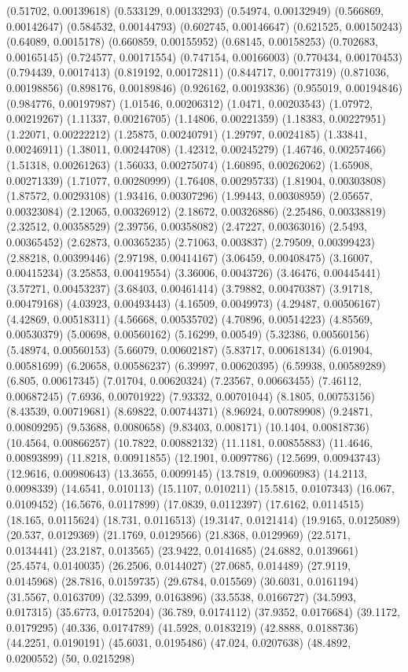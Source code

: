 {(0.51702, 0.00139618)
(0.533129, 0.00133293)
(0.54974, 0.00132949)
(0.566869, 0.00142647)
(0.584532, 0.00144793)
(0.602745, 0.00146647)
(0.621525, 0.00150243)
(0.64089, 0.0015178)
(0.660859, 0.00155952)
(0.68145, 0.00158253)
(0.702683, 0.00165145)
(0.724577, 0.00171554)
(0.747154, 0.00166003)
(0.770434, 0.00170453)
(0.794439, 0.0017413)
(0.819192, 0.00172811)
(0.844717, 0.00177319)
(0.871036, 0.00198856)
(0.898176, 0.00189846)
(0.926162, 0.00193836)
(0.955019, 0.00194846)
(0.984776, 0.00197987)
(1.01546, 0.00206312)
(1.0471, 0.00203543)
(1.07972, 0.00219267)
(1.11337, 0.00216705)
(1.14806, 0.00221359)
(1.18383, 0.00227951)
(1.22071, 0.00222212)
(1.25875, 0.00240791)
(1.29797, 0.0024185)
(1.33841, 0.00246911)
(1.38011, 0.00244708)
(1.42312, 0.00245279)
(1.46746, 0.00257466)
(1.51318, 0.00261263)
(1.56033, 0.00275074)
(1.60895, 0.00262062)
(1.65908, 0.00271339)
(1.71077, 0.00280999)
(1.76408, 0.00295733)
(1.81904, 0.00303808)
(1.87572, 0.00293108)
(1.93416, 0.00307296)
(1.99443, 0.00308959)
(2.05657, 0.00323084)
(2.12065, 0.00326912)
(2.18672, 0.00326886)
(2.25486, 0.00338819)
(2.32512, 0.00358529)
(2.39756, 0.00358082)
(2.47227, 0.00363016)
(2.5493, 0.00365452)
(2.62873, 0.00365235)
(2.71063, 0.003837)
(2.79509, 0.00399423)
(2.88218, 0.00399446)
(2.97198, 0.00414167)
(3.06459, 0.00408475)
(3.16007, 0.00415234)
(3.25853, 0.00419554)
(3.36006, 0.0043726)
(3.46476, 0.00445441)
(3.57271, 0.00453237)
(3.68403, 0.00461414)
(3.79882, 0.00470387)
(3.91718, 0.00479168)
(4.03923, 0.00493443)
(4.16509, 0.0049973)
(4.29487, 0.00506167)
(4.42869, 0.00518311)
(4.56668, 0.00535702)
(4.70896, 0.00514223)
(4.85569, 0.00530379)
(5.00698, 0.00560162)
(5.16299, 0.00549)
(5.32386, 0.00560156)
(5.48974, 0.00560153)
(5.66079, 0.00602187)
(5.83717, 0.00618134)
(6.01904, 0.00581699)
(6.20658, 0.00586237)
(6.39997, 0.00620395)
(6.59938, 0.00589289)
(6.805, 0.00617345)
(7.01704, 0.00620324)
(7.23567, 0.00663455)
(7.46112, 0.00687245)
(7.6936, 0.00701922)
(7.93332, 0.00701044)
(8.1805, 0.00753156)
(8.43539, 0.00719681)
(8.69822, 0.00744371)
(8.96924, 0.00789908)
(9.24871, 0.00809295)
(9.53688, 0.0080658)
(9.83403, 0.008171)
(10.1404, 0.00818736)
(10.4564, 0.00866257)
(10.7822, 0.00882132)
(11.1181, 0.00855883)
(11.4646, 0.00893899)
(11.8218, 0.00911855)
(12.1901, 0.0097786)
(12.5699, 0.00943743)
(12.9616, 0.00980643)
(13.3655, 0.0099145)
(13.7819, 0.00960983)
(14.2113, 0.0098339)
(14.6541, 0.010113)
(15.1107, 0.010211)
(15.5815, 0.0107343)
(16.067, 0.0109452)
(16.5676, 0.0117899)
(17.0839, 0.0112397)
(17.6162, 0.0114515)
(18.165, 0.0115624)
(18.731, 0.0116513)
(19.3147, 0.0121414)
(19.9165, 0.0125089)
(20.537, 0.0129369)
(21.1769, 0.0129566)
(21.8368, 0.0129969)
(22.5171, 0.0134441)
(23.2187, 0.013565)
(23.9422, 0.0141685)
(24.6882, 0.0139661)
(25.4574, 0.0140035)
(26.2506, 0.0144027)
(27.0685, 0.014489)
(27.9119, 0.0145968)
(28.7816, 0.0159735)
(29.6784, 0.015569)
(30.6031, 0.0161194)
(31.5567, 0.0163709)
(32.5399, 0.0163896)
(33.5538, 0.0166727)
(34.5993, 0.017315)
(35.6773, 0.0175204)
(36.789, 0.0174112)
(37.9352, 0.0176684)
(39.1172, 0.0179295)
(40.336, 0.0174789)
(41.5928, 0.0183219)
(42.8888, 0.0188736)
(44.2251, 0.0190191)
(45.6031, 0.0195486)
(47.024, 0.0207638)
(48.4892, 0.0200552)
(50, 0.0215298)
}

